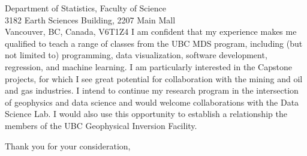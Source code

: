 \documentclass[11pt]{letter}
\begin{document}
\begin{letter}{
    Department of Statistics, Faculty of Science
    \\
    3182 Earth Sciences Building, 2207 Main Mall
    \\
    Vancouver, BC, Canada, V6T1Z4
}
I am confident that my experience makes me qualified to teach a range of
classes from the UBC MDS program, including (but not limited to) programming,
data visualization, software development, regression, and machine learning.
I am particularly interested in the Capstone projects, for which I see great
potential for collaboration with the mining and oil and gas industries.
I intend to continue my research program in the intersection of geophysics and
data science and would welcome collaborations with the Data Science Lab.
I would also use this opportunity to establish a relationship the members of
the UBC Geophysical Inversion Facility.


\closing{Thank you for your consideration,}

\end{letter}
\end{document}
